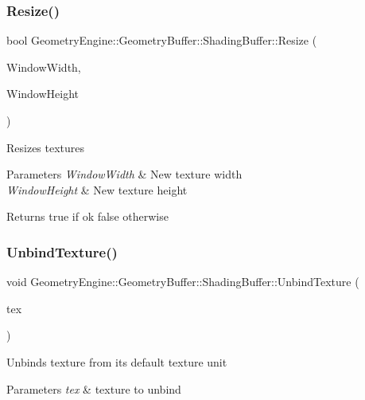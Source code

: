 \subsubsection{\texorpdfstring{Resize()}{Resize()}}
{\footnotesize\ttfamily bool Geometry\+Engine\+::\+Geometry\+Buffer\+::\+Shading\+Buffer\+::\+Resize (\begin{DoxyParamCaption}\item[{unsigned int}]{Window\+Width,  }\item[{unsigned int}]{Window\+Height }\end{DoxyParamCaption})}

Resizes textures 
\begin{DoxyParams}{Parameters}
{\em Window\+Width} & New texture width \\
\hline
{\em Window\+Height} & New texture height \\
\hline
\end{DoxyParams}
\begin{DoxyReturn}{Returns}
true if ok false otherwise 
\end{DoxyReturn}
\mbox{\label{class_geometry_engine_1_1_geometry_buffer_1_1_shading_buffer_acd58b856df03ec7eec5313356c3f8c46}} 
\subsubsection{\texorpdfstring{UnbindTexture()}{UnbindTexture()}\hspace{0.1cm}{\footnotesize\ttfamily [1/2]}}
{\footnotesize\ttfamily void Geometry\+Engine\+::\+Geometry\+Buffer\+::\+Shading\+Buffer\+::\+Unbind\+Texture (\begin{DoxyParamCaption}\item[{\mbox{\hyperlink{class_geometry_engine_1_1_geometry_buffer_1_1_shading_buffer_a8047a079ff9fb9fa3400651664c92ae9}{S\+H\+A\+D\+I\+N\+G\+B\+U\+F\+F\+E\+R\+\_\+\+T\+E\+X\+T\+U\+R\+E\+\_\+\+T\+Y\+PE}}}]{tex }\end{DoxyParamCaption})}

Unbinds texture from its default texture unit 
\begin{DoxyParams}{Parameters}
{\em tex} & texture to unbind \\
\hline
\end{DoxyParams}
\mbox{\label{class_geometry_engine_1_1_geometry_buffer_1_1_shading_buffer_ad80b99462f09f88f2937542b72d909f9}} 
